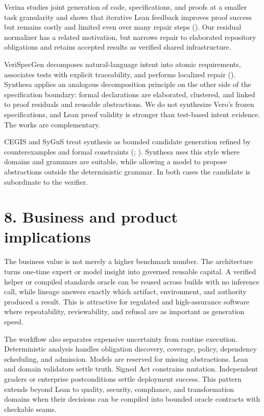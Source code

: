 \documentclass[
  10pt,
]{article}
\begin{document}
Verina studies joint generation of code, specifications, and proofs at a
smaller task granularity and shows that iterative Lean feedback improves
proof success but remains costly and limited even over many repair steps
(). Our residual normalizer has
a related motivation, but narrows repair to elaborated repository
obligations and retains accepted results as verified shared
infrastructure.

VeriSpecGen decomposes natural-language intent into atomic requirements,
associates tests with explicit traceability, and performs localized
repair (). Synthesa
applies an analogous decomposition principle on the other side of the
specification boundary: formal declarations are elaborated, clustered,
and linked to proof residuals and reusable abstractions. We do not
synthesize Vero's frozen specifications, and Lean proof validity is
stronger than test-based intent evidence. The works are complementary.

CEGIS and SyGuS treat synthesis as bounded candidate generation refined
by counterexamples and formal constraints
(;
). Synthesa uses this style
where domains and grammars are suitable, while allowing a model to
propose abstractions outside the deterministic grammar. In both cases
the candidate is subordinate to the verifier.

\section{8. Business and product
implications}\label{business-and-product-implications}

The business value is not merely a higher benchmark number. The
architecture turns one-time expert or model insight into governed
reusable capital. A verified helper or compiled standards oracle can be
reused across builds with no inference call, while lineage answers
exactly which artifact, environment, and authority produced a result.
This is attractive for regulated and high-assurance software where
repeatability, reviewability, and refusal are as important as generation
speed.

The workflow also separates expensive uncertainty from routine
execution. Deterministic analysis handles obligation discovery,
coverage, policy, dependency scheduling, and admission. Models are
reserved for missing abstractions. Lean and domain validators settle
truth. Signed Act constrains mutation. Independent graders or enterprise
postconditions settle deployment success. This pattern extends beyond
Lean to quality, security, compliance, and transformation domains when
their decisions can be compiled into bounded oracle contracts with
checkable seams.
\end{document}

